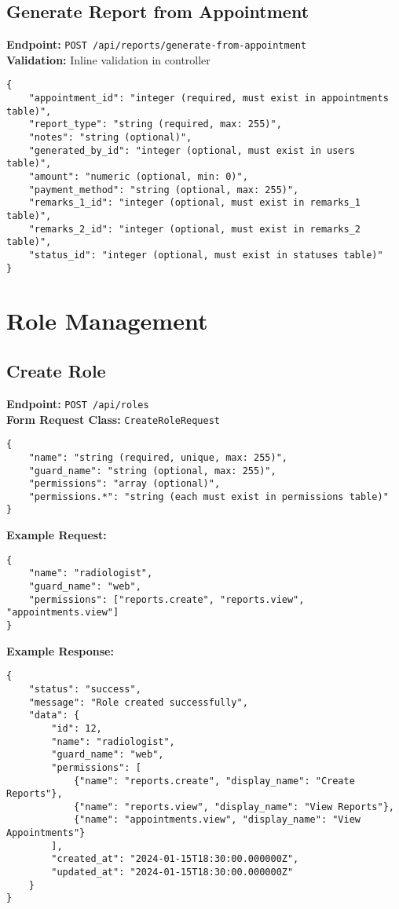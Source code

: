 \documentclass[12pt,a4paper]{article}
\begin{document}
\subsection{Generate Report from Appointment}
\textbf{Endpoint:} \texttt{POST /api/reports/generate-from-appointment}\\
\textbf{Validation:} Inline validation in controller

\begin{lstlisting}[caption=Generate Report from Appointment Request Body]
{
    "appointment_id": "integer (required, must exist in appointments table)",
    "report_type": "string (required, max: 255)",
    "notes": "string (optional)",
    "generated_by_id": "integer (optional, must exist in users table)",
    "amount": "numeric (optional, min: 0)",
    "payment_method": "string (optional, max: 255)",
    "remarks_1_id": "integer (optional, must exist in remarks_1 table)",
    "remarks_2_id": "integer (optional, must exist in remarks_2 table)",
    "status_id": "integer (optional, must exist in statuses table)"
}
\end{lstlisting}

\section{Role Management}

\subsection{Create Role}
\textbf{Endpoint:} \texttt{POST /api/roles}\\
\textbf{Form Request Class:} \texttt{CreateRoleRequest}

\begin{lstlisting}[caption=Create Role Request Body]
{
    "name": "string (required, unique, max: 255)",
    "guard_name": "string (optional, max: 255)",
    "permissions": "array (optional)",
    "permissions.*": "string (each must exist in permissions table)"
}
\end{lstlisting}

\textbf{Example Request:}
\begin{lstlisting}[caption=Create Role Example Request]
{
    "name": "radiologist",
    "guard_name": "web",
    "permissions": ["reports.create", "reports.view", "appointments.view"]
}
\end{lstlisting}

\textbf{Example Response:}
\begin{lstlisting}[caption=Create Role Example Response]
{
    "status": "success",
    "message": "Role created successfully",
    "data": {
        "id": 12,
        "name": "radiologist",
        "guard_name": "web",
        "permissions": [
            {"name": "reports.create", "display_name": "Create Reports"},
            {"name": "reports.view", "display_name": "View Reports"},
            {"name": "appointments.view", "display_name": "View Appointments"}
        ],
        "created_at": "2024-01-15T18:30:00.000000Z",
        "updated_at": "2024-01-15T18:30:00.000000Z"
    }
}
\end{lstlisting}
\end{document}
